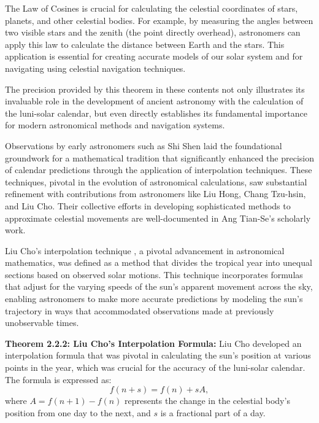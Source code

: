 \documentclass[10pt]{article}
\begin{document}
\vspace{7pt}

The Law of Cosines is crucial for calculating the celestial coordinates of stars, planets, and other celestial bodies. For example, by measuring the angles between two visible stars and the zenith (the point directly overhead), astronomers can apply this law to calculate the distance between Earth and the stars. This application is essential for creating accurate models of our solar system and for navigating using celestial navigation techniques.

\vspace{7pt}

The precision provided by this theorem in these contents not only illustrates its invaluable role in the development of ancient astronomy with the calculation of the luni-solar calendar, but even directly establishes its fundamental importance for modern astronomical methods and navigation systems.

\vspace{7pt}

Observations by early astronomers such as Shi Shen laid the foundational groundwork for a mathematical tradition that significantly enhanced the precision of calendar predictions through the application of interpolation techniques. These techniques, pivotal in the evolution of astronomical calculations, saw substantial refinement with contributions from astronomers like Liu Hong, Chang Tzu-hsin, and Liu Cho. Their collective efforts in developing sophisticated methods to approximate celestial movements are well-documented in Ang Tian-Se's scholarly work.

\vspace{7pt}

Liu Cho's interpolation technique \autocite{Dauben_2000b}, a pivotal advancement in astronomical mathematics, was defined as a method that divides the tropical year into unequal sections based on observed solar motions. This technique incorporates formulas that adjust for the varying speeds of the sun’s apparent movement across the sky, enabling astronomers to make more accurate predictions by modeling the sun's trajectory in ways that accommodated observations made at previously unobservable times. 

\vspace{7pt}

\textbf{Theorem 2.2.2: Liu Cho's Interpolation Formula:} Liu Cho developed an interpolation formula that was pivotal in calculating the sun's position at various points in the year, which was crucial for the accuracy of the luni-solar calendar. The formula is expressed as:
\[
f(n + s) = f(n) + sA,
\]
where \( A = f(n+1) - f(n) \) represents the change in the celestial body's position from one day to the next, and \( s \) is a fractional part of a day.
\end{document}

